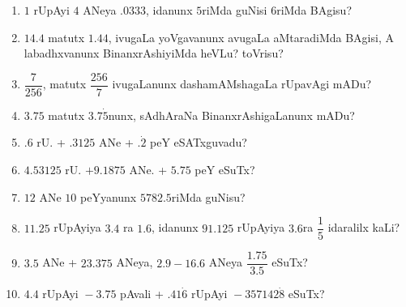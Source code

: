 \begin{enumerate}[\rm(1)]
\item $1$ rUpAyi $4$ ANeya $.0333$, idanunx $5$riMda guNisi $6$riMda BAgisu?

\item $14.4$ matutx $1.44$, ivugaLa yoVgavanunx avugaLa aMtaradiMda BAgisi, A labadhxvanunx BinanxrAshiyiMda heVLu? toVrisu?

\item $\dfrac{7}{256}$, matutx $\dfrac{256}{7}$ ivugaLanunx dashamAMshagaLa rUpavAgi mADu?

\item $3.75$ matutx $3.7\dot5$nunx, sAdhAraNa BinanxrAshigaLanunx mADu?

\item $.6$ rU. + $.3125$  ANe + .$\dot2$ peY eSATxguvadu?

\item $4.53125$ rU. $+ 9. 1875$ ANe. + $5.75$  peY eSuTx?

\item $12$ ANe $10$ peYyanunx $5782.5$riMda guNisu?

\item $11.25$ rUpAyiya $3.4$ ra $1.6$, idanunx $91.125$ rUpAyiya $3.6$ra $\dfrac{1}{5}$ idaralilx kaLi?

\item $3.5$ ANe + $23.375$ ANeya, $2.9-16.6$ ANeya $\dfrac{1.75}{3.5}$ eSuTx?

\item $4.4$ rUpAyi ${}-3.75$ pAvali + $.41\dot6$ rUpAyi ${}-357142\dot8$ eSuTx?
\end{enumerate}




